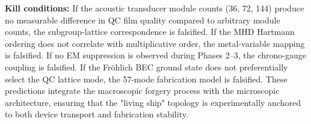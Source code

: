 \textbf{Kill conditions:} If the acoustic transducer module counts (36, 72, 144) produce no measurable difference in QC film quality compared to arbitrary module counts, the subgroup-lattice correspondence is falsified. If the MHD Hartmann ordering does not correlate with multiplicative order, the metal-variable mapping is falsified. If no EM suppression is observed during Phases 2--3, the chrono-gauge coupling is falsified. If the Fröhlich BEC ground state does not preferentially select the QC lattice mode, the 57-mode fabrication model is falsified. These predictions integrate the macroscopic forgery process with the microscopic architecture, ensuring that the "living ship" topology is experimentally anchored to both device transport and fabrication stability.

\vspace{2em}
